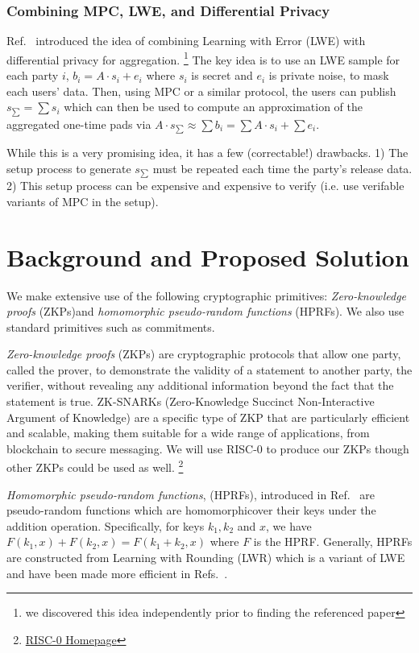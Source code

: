 \documentclass[11pt]{article}
\begin{document}
\subsubsection*{Combining MPC, LWE, and Differential Privacy}
Ref.~\cite{stevens2021efficientdifferentiallyprivatesecure} introduced the idea of combining Learning with Error (LWE) with differential privacy for aggregation.
\footnote{we discovered this idea independently prior to finding the referenced paper}
The key idea is to use an LWE sample for each party $i$, $b_i = A \cdot s_i + e_i$ where $s_i$ is secret and $e_i$ is private noise, to mask each users' data.
Then, using MPC or a similar protocol, the users can publish $s_{\sum} = \sum s_i$ which can then be used to compute an approximation of the aggregated one-time pads via $A \cdot s_{\sum} \approx \sum b_i = \sum A \cdot s_i + \sum e_i$.

While this is a very promising idea, it has a few (correctable!) drawbacks.
1) The setup process to generate $s_{\sum}$ must be repeated each time the party's release data.
2) This setup process can be expensive and expensive to verify (i.e. use verifable variants of MPC in the setup).

\section{Background and Proposed Solution}
We make extensive use of the following cryptographic primitives: \emph{Zero-knowledge proofs} (ZKPs)and \emph{homomorphic pseudo-random functions} (HPRFs).
We also use standard primitives such as commitments.

\emph{Zero-knowledge proofs} (ZKPs) are cryptographic protocols that allow one party, called the prover, to demonstrate the validity of a statement to another party, the verifier, without revealing any additional information beyond the fact that the statement is true. 
ZK-SNARKs (Zero-Knowledge Succinct Non-Interactive Argument of Knowledge) are a specific type of ZKP that are particularly efficient and scalable, making them suitable for a wide range of applications, from blockchain to secure messaging.
We will use RISC-0 to produce our ZKPs though other ZKPs could be used as well.
\footnote{\href{https://risczero.com/}{RISC-0 Homepage}}

\emph{Homomorphic pseudo-random functions}, (HPRFs), introduced in Ref.~\cite{boneh2013key} are pseudo-random functions which are homomorphicover their keys under the addition operation.
Specifically, for keys $k_1, k_2$ and $x$, we have $F(k_1, x) + F(k_2, x) = F(k_1 + k_2, x)$ where $F$ is the HPRF.
Generally, HPRFs are constructed from Learning with Rounding (LWR) which is a variant of LWE and have been made more efficient in Refs.~\cite{newKeyHom, kim2020key}.
\end{document}
